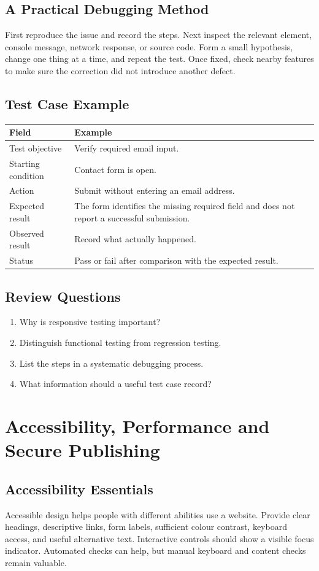 \documentclass[11pt,openany,oneside]{book}
\begin{document}
\section{A Practical Debugging Method}
First reproduce the issue and record the steps. Next inspect the relevant element, console message, network response, or source code. Form a small hypothesis, change one thing at a time, and repeat the test. Once fixed, check nearby features to make sure the correction did not introduce another defect.

\section{Test Case Example}
\begin{tabularx}{\textwidth}{p{}X}
\toprule
Field & Example\\
\midrule
Test objective & Verify required email input.\\
Starting condition & Contact form is open.\\
Action & Submit without entering an email address.\\
Expected result & The form identifies the missing required field and does not report a successful submission.\\
Observed result & Record what actually happened.\\
Status & Pass or fail after comparison with the expected result.\\
\bottomrule
\end{tabularx}

\section*{Review Questions}
\begin{enumerate}
\item Why is responsive testing important?
\item Distinguish functional testing from regression testing.
\item List the steps in a systematic debugging process.
\item What information should a useful test case record?
\end{enumerate}

\chapter{Accessibility, Performance and Secure Publishing}
\section{Accessibility Essentials}
Accessible design helps people with different abilities use a website. Provide clear headings, descriptive links, form labels, sufficient colour contrast, keyboard access, and useful alternative text. Interactive controls should show a visible focus indicator. Automated checks can help, but manual keyboard and content checks remain valuable.
\end{document}
